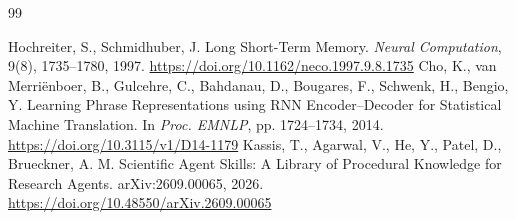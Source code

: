 \documentclass[10pt,a4paper,twocolumn]{article}
\begin{document}
\begin{thebibliography}{99}
\begin{singlespace}
 Hochreiter, S., Schmidhuber, J. Long Short-Term Memory. \emph{Neural Computation}, 9(8), 1735--1780, 1997. \url{https://doi.org/10.1162/neco.1997.9.8.1735}
 Cho, K., van Merri\"enboer, B., Gulcehre, C., Bahdanau, D., Bougares, F., Schwenk, H., Bengio, Y. Learning Phrase Representations using RNN Encoder--Decoder for Statistical Machine Translation. In \emph{Proc. EMNLP}, pp. 1724--1734, 2014. \url{https://doi.org/10.3115/v1/D14-1179}
 Kassis, T., Agarwal, V., He, Y., Patel, D., Brueckner, A. M. Scientific Agent Skills: A Library of Procedural Knowledge for Research Agents. arXiv:2609.00065, 2026. \url{https://doi.org/10.48550/arXiv.2609.00065}
\end{singlespace}
\end{thebibliography}
\end{document}
